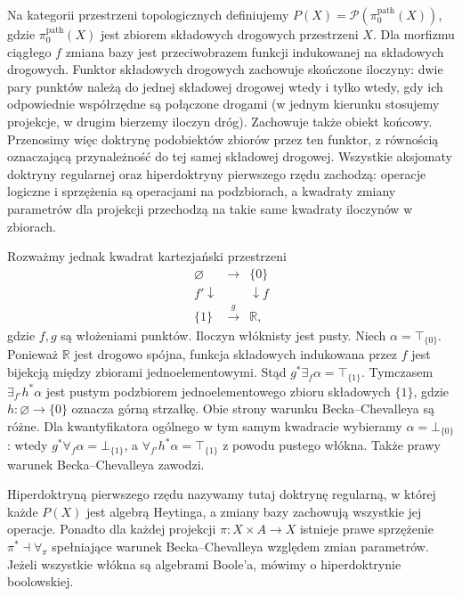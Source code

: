 \begin{przyklad}\label{cat:ex:cl-doctrine-bc-failure}
Na kategorii przestrzeni topologicznych definiujemy $P(X)=\mathcal P(\pi_0^{\mathrm{path}}(X))$, gdzie $\pi_0^{\mathrm{path}}(X)$ jest zbiorem składowych drogowych przestrzeni $X$. Dla morfizmu ciągłego $f$ zmiana bazy jest przeciwobrazem funkcji indukowanej na składowych drogowych. Funktor składowych drogowych zachowuje skończone iloczyny: dwie pary punktów należą do jednej składowej drogowej wtedy i tylko wtedy, gdy ich odpowiednie współrzędne są połączone drogami (w jednym kierunku stosujemy projekcje, w drugim bierzemy iloczyn dróg). Zachowuje także obiekt końcowy. Przenosimy więc doktrynę podobiektów zbiorów przez ten funktor, z równością oznaczającą przynależność do tej samej składowej drogowej. Wszystkie aksjomaty doktryny regularnej oraz hiperdoktryny pierwszego rzędu zachodzą: operacje logiczne i sprzężenia są operacjami na podzbiorach, a kwadraty zmiany parametrów dla projekcji przechodzą na takie same kwadraty iloczynów w zbiorach.

Rozważmy jednak kwadrat kartezjański przestrzeni
\[
\begin{array}{ccc}
 \varnothing&\longrightarrow&\{0\}\\
 {\scriptstyle f'}\downarrow&&\downarrow{\scriptstyle f}\\
 \{1\}&\xrightarrow{g}&\mathbb R,
\end{array}
\]
gdzie $f,g$ są włożeniami punktów. Iloczyn włóknisty jest pusty. Niech $\alpha=\top_{\{0\}}$. Ponieważ $\mathbb R$ jest drogowo spójna, funkcja składowych indukowana przez $f$ jest bijekcją między zbiorami jednoelementowymi. Stąd $g^*\exists_f\alpha=\top_{\{1\}}$. Tymczasem $\exists_{f'}h^*\alpha$ jest pustym podzbiorem jednoelementowego zbioru składowych $\{1\}$, gdzie $h:\varnothing\to\{0\}$ oznacza górną strzałkę. Obie strony warunku Becka--Chevalleya są różne. Dla kwantyfikatora ogólnego w tym samym kwadracie wybieramy $\alpha=\bot_{\{0\}}$: wtedy $g^*\forall_f\alpha=\bot_{\{1\}}$, a $\forall_{f'}h^*\alpha=\top_{\{1\}}$ z powodu pustego włókna. Także prawy warunek Becka--Chevalleya zawodzi.
\end{przyklad}

\begin{definicja}\label{cat:def:cl-first-order-doctrine}
Hiperdoktryną pierwszego rzędu nazywamy tutaj doktrynę regularną, w której każde $P(X)$ jest algebrą Heytinga, a zmiany bazy zachowują wszystkie jej operacje. Ponadto dla każdej projekcji $\pi:X\times A\to X$ istnieje prawe sprzężenie $\pi^*\dashv\forall_\pi$ spełniające warunek Becka--Chevalleya względem zmian parametrów. Jeżeli wszystkie włókna są algebrami Boole'a, mówimy o hiperdoktrynie boolowskiej.
\end{definicja}

